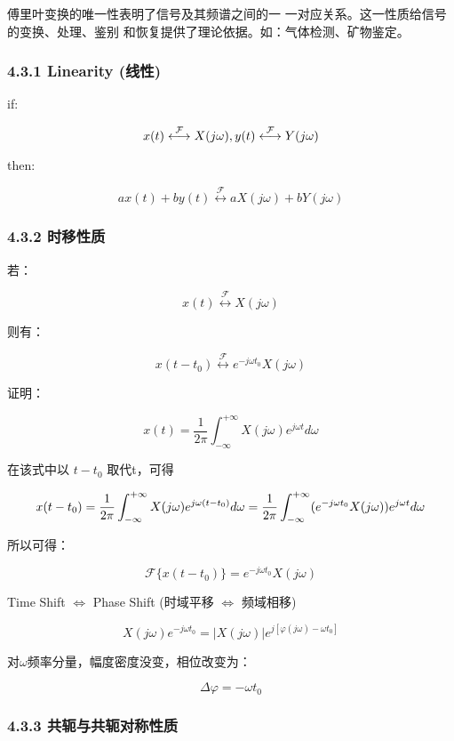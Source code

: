 \documentclass[
]{article}
\begin{document}
傅里叶变换的唯一性表明了信号及其频谱之间的一
一对应关系。这一性质给信号的变换、处理、鉴别
和恢复提供了理论依据。如：气体检测、矿物鉴定。

\subsubsection{4.3.1 Linearity (线性)}\label{431-linearity-ux7ebfux6027}

if:

\[x(t)\stackrel{\mathcal{F}}{\longleftrightarrow}X(j\omega),   y(t)\stackrel{\mathcal{F}}{\longleftrightarrow} Y(j\omega)\\\]

then:

\[ax(t)+by(t)\stackrel{\mathcal{F}}{\longleftrightarrow}aX(j\omega)+bY(j\omega)\]

\subsubsection{4.3.2 时移性质}\label{432-ux65f6ux79fbux6027ux8d28}

若：

\[x(t)\stackrel{\mathcal{F}}{\longleftrightarrow}X(j\omega)\]

则有：

\[x(t-t_0)\stackrel{\mathcal{F}}{\longleftrightarrow}e^{-j\omega t_0}X(j\omega)\]

证明：

\[x(t)=\frac{1}{2\pi}\int_{-\infty}^{+\infty}X(j\omega)e^{j\omega t}d\omega\]

在该式中以 \(t-t_0\) 取代t，可得

\[x(t-t_0)=\frac{1}{2\pi}\int_{-\infty}^{+\infty}X(j\omega)e^{j\omega (t-t_0)}d\omega\\
=\frac{1}{2\pi}\int_{-\infty}^{+\infty}(e^{-j\omega t_0 }X(j\omega))e^{j\omega t}d\omega\]

所以可得：

\[\mathcal{F}\{x(t-t_0)\} =e^{-j\omega t_0}X(j\omega)\]

Time Shift \( \Longleftrightarrow \) Phase Shift (时域平移
\( \Longleftrightarrow \) 频域相移)

\[X(j\omega)e^{-j\omega t_0}=|X(j\omega)|e^{j[\varphi(j\omega)-\omega t_0]}\]

对\(\omega\)频率分量，幅度密度没变，相位改变为：

\[\Delta\varphi = -\omega t_0\]

\subsubsection{4.3.3
共轭与共轭对称性质}\label{433-ux5171ux8f6dux4e0eux5171ux8f6dux5bf9ux79f0ux6027ux8d28}
\end{document}
